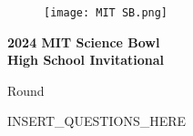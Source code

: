 \documentclass[12pt]{article}
\begin{document}
\vspace*{1cm}
\begin{center}
    \begin{figure}[h]
    \texttt{[image: MIT SB.png]}
    \centering
    \end{figure}

  \begin{huge}

    {\selectfont

      \textbf{2024 MIT Science Bowl \\High School Invitational}

      \vspace{10pt} \par Round \roundnumber

    }

  \end{huge}

\end{center}

\vspace{1em}

\ifdefined\timewarning

\begin{center}
    
  \begin{LARGE}

    \color{red}

    \setlength{\fboxsep}{0.5em}
    \setlength{\fboxrule}{2pt}
    
  \end{LARGE}

\end{center}

\restoregeometry

\fi


\pagebreak

\filbreak

INSERT_QUESTIONS_HERE
\end{document}
